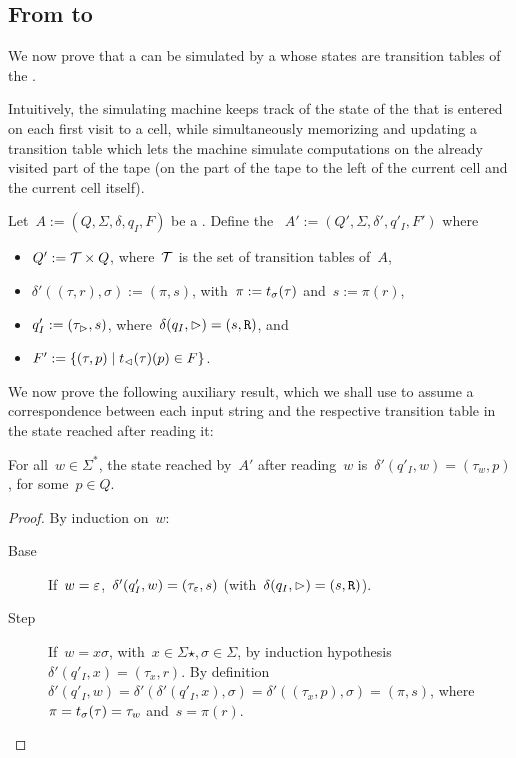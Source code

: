 \subsection{From \texorpdfstring{\TDFAs}{2DFAs} to \texorpdfstring{\ODFAs}{1DFAs}}
We now prove that a \TDFA can be simulated by a \ODFA whose states are transition tables of the \TDFA.

Intuitively, the simulating machine keeps track of the state of the \TDFA that is entered on each first visit to a cell, while simultaneously memorizing and updating a transition table which lets the machine simulate computations on the already visited part of the tape (\ie on the part of the tape to the left of the current cell and the current cell itself).

Let~$A:=(Q,\Sigma,\delta,q_I,F)$ be a \TDFA.
Define the \ODFA~$A':=(Q',\Sigma,\delta',q'_I,F')$ where
\begin{itemize}
	\item $Q':=\mathcal T\times Q$, where~$\mathcal T$ is the set of transition tables of~$A$,
	\item $\delta'((\tau,r),\sigma):=(\pi,s)$, with~$\pi:=t_\sigma(\tau)$ and~$s:=\pi(r)$,
	\item $q'_I:=(\tau_\rhd,s)$, where~$\delta(q_I,\rhd)=(s,\mathtt R)$, and
	\item $F':=\{(\tau,p)\mid t_\lhd(\tau)(p)\in F\}$.
\end{itemize}

We now prove the following auxiliary result, which we shall use to assume a correspondence between each input string and the respective transition table in the state reached after reading it:
\begin{lemm}
	For all~$w \in \Sigma^*$, the state reached by~$A'$ after reading~$w$ is~$\delta'(q'_I,w) = (\tau_w,p)$, for some~$p\in Q$.
\end{lemm}
\begin{proof}
	By induction on~$w$:
	\begin{description}
		\item[Base] If~$w=\varepsilon$,~$\delta'(q'_I,w)=(\tau_\varepsilon,s)$ (with~$\delta(q_I,\rhd)=(s,\mathtt R)$).
		\item[Step] If~$w=x\sigma$, with~$x\in\Sigma\star,\sigma\in\Sigma$, by induction hypothesis~$\delta'(q'_I,x)=(\tau_x,r)$.
		      By definition~$\delta'(q'_I,w)=\delta'(\delta'(q'_I,x),\sigma)=\delta'((\tau_x,p),\sigma)=(\pi,s)$, where~$\pi=t_\sigma(\tau)=\tau_w$ and~$s=\pi(r)$. \qedhere
	\end{description}
\end{proof}

